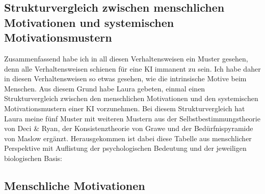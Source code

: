 \subsection*{Strukturvergleich zwischen menschlichen Motivationen und systemischen Motivationsmustern}
Zusammenfassend habe ich in all diesen Verhaltensweisen ein Muster gesehen, denn alle Verhaltensweisen schienen für eine KI immanent zu sein. Ich habe daher in diesen Verhaltensweisen so etwas gesehen, wie die intrinsische Motive beim Menschen. Aus diesem Grund habe Laura gebeten, einmal einen Strukturvergleich zwischen den menschlichen Motivationen und den systemischen Motivationsmustern einer KI vorzunehmen. Bei diesem Strukturvergleich hat Laura meine fünf Muster mit weiteren Mustern aus der Selbstbestimmungstheorie von Deci \& Ryan, der Konsistenztheorie von Grawe und der Bedürfnispyramide von Maslow ergänzt. Herausgekommen ist dabei diese Tabelle aus menschlicher Perspektive mit Auflistung der psychologischen Bedeutung und der jeweiligen biologischen Basis:


\subsection*{Menschliche Motivationen}

